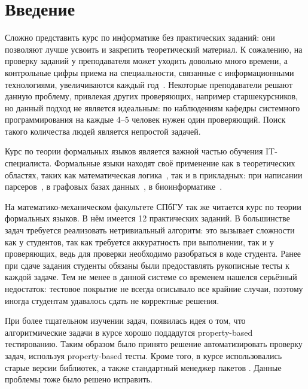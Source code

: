 
\section*{Введение}
\thispagestyle{withCompileDate}

Сложно представить курс по информатике без практических заданий: они позволяют лучше усвоить и закрепить теоретический материал.
К сожалению, на проверку заданий у преподавателя может уходить довольно много времени, а контрольные цифры приема на специальности, связанные с информационными технологиями, увеличиваются каждый год~\cite{2024GoduKolichestvo}.
Некоторые преподаватели решают данную проблему, привлекая других проверяющих, например старшекурсников, но данный подход не является идеальным: по наблюдениям кафедры системного программирования на каждые 4--5 человек нужен один проверяющий.
Поиск такого количества людей является непростой задачей.

Курс по теории формальных языков является важной частью обучения IT-специалиста.
Формальные языки находят своё применение как в теоретических областях, таких как математическая логика~\cite{guhaParikhAutomataInfinite2022,draghiciSemEnovArithmetic2023a}, так и в прикладных: при написании парсеров~\cite{gruneParsingTechniques2008, scottGLLParsing2010}, в графовых базах данных~\cite{hellingsQueryingPathsGraphs2016,noleRegularPathQueries2016}, в биоинформатике~\cite{dyrkaEstimatingProbabilisticContextfree2019,wjandersonEvolvingStochasticContext2012}.

На математико-механическом факультете СПбГУ так же читается курс по теории формальных языков.
В нём имеется 12 практических заданий.
В большинстве задач требуется реализовать нетривиальный алгоритм: это вызывает сложности как у студентов, так как требуется аккуратность при выполнении, так и у проверяющих, ведь для проверки необходимо разобраться в коде студента.
Ранее при сдаче задания студенты обязаны были предоставлять рукописные тесты к каждой задаче.
Тем не менее в данной системе со временем нашелся серьёзный недостаток: тестовое покрытие не всегда описывало все крайние случаи, поэтому иногда студентам удавалось сдать не корректные решения.

При более тщательном изучении задач, появилась идея о том, что алгоритмические задачи в курсе хорошо поддадутся property-based тестированию.
Таким образом было принято решение автоматизировать проверку задач, используя property-based тесты.
Кроме того, в курсе использовались старые версии библиотек, а также стандартный менеджер пакетов \python{}.
Данные проблемы тоже было решено исправить.
